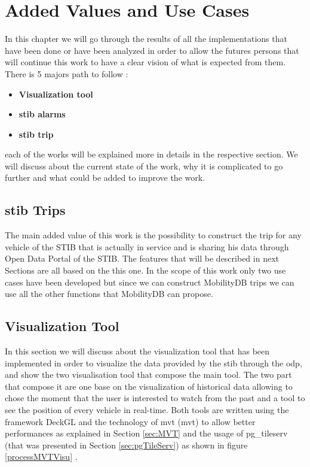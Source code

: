 \documentclass[12pt]{report}
\begin{document}
	\chapter{Added Values and Use Cases}
	
	In this chapter we will go through the results of all the implementations that have been done or have been analyzed in order to allow the futures persons that will continue this work to have a clear vision of what is expected from them. There is 5 majors path to follow : 
	
	\begin{itemize}[noitemsep]
		\item \textbf{Visualization tool}
		\item \textbf{\acrshort{stib} alarms}
		\item \textbf{\acrshort{stib} trip}
	\end{itemize}
	
	each of the works will be explained more in details in the respective section. We will discuss about the current state of the work, why it is complicated to go further and what could be added to improve the work.
	
	\section{\acrshort{stib} Trips}
	
	The main added value of  this work is the possibility to construct the trip for any vehicle of the STIB that is actually in service and is sharing  his data through Open Data Portal of the STIB. The features that will be described in next Sections are all based on the this one. In the scope of this work only two use cases have been developed but since we can construct MobilityDB trips we can use all the other functions that MobilityDB can propose.
	
	
	
	
	
	\section{Visualization Tool}
	
	In this section we will discuss about the visualization tool that has been implemented in order to visualize the data provided by the \acrshort{stib} through the \acrshort{odp}, and show the two visualisation tool that compose the main tool. The two part that compose it are  one base on the visualization of historical  data allowing to chose the moment that the user is interested to watch from the past and a tool to see the position of every vehicle in real-time. Both tools are written using the framework DeckGL and the technology of \acrlong{mvt} (\acrshort{mvt}) to allow better performances as explained in Section \ref{sec:MVT} and the usage of pg\_tileserv (that was presented in Section \ref{sec:pgTileServ}) as shown in figure \ref{processMVTVisu} .
	
\end{document}
